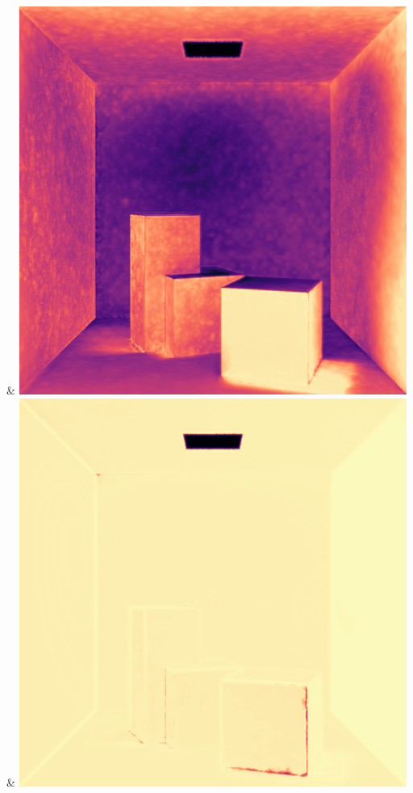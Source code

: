 & \includegraphics[width=\linewidth]{figures/py/tests/quality_comparison/nrc+naive_1spp_diffuse_flip.png}
& \includegraphics[width=\linewidth]{figures/py/tests/quality_comparison/nrc+naive+bal_1spp_diffuse_flip.png}
